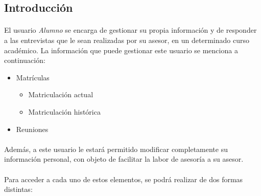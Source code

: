 \subsection{Introducción}

  \paragraph{}El usuario \textit{Alumno} se encarga de gestionar su propia
  información y de responder a las entrevistas que le sean realizadas por su
  asesor, en un determinado curso académico. La información que puede gestionar
  este usuario se menciona a continuación:

  \begin{itemize}
   \item Matrículas
   \begin{itemize}
      \item Matriculación actual
      \item Matriculación histórica
   \end{itemize}
   \item Reuniones
  \end{itemize}

  \paragraph{}Además, a este usuario le estará permitido modificar completamente
  su información personal, con objeto de facilitar la labor de asesoría a su
  asesor.

  \paragraph{}Para acceder a cada uno de estos elementos, se podrá realizar de
  dos formas distintas:

